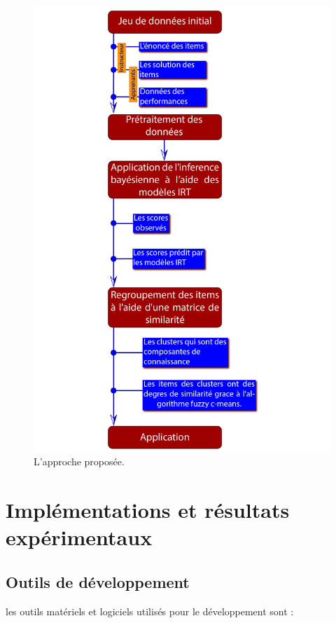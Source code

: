 \begin{figure}[H]
	\begin{center}
		\includegraphics[width=\textwidth]{images/chapitre7/approch.png}
	\end{center}
	\caption{L'approche proposée.}
	\label{approch}
\end{figure}

\section{Implémentations et résultats expérimentaux}

\subsection{Outils de développement}
les outils matériels et logiciels utilisés pour le développement sont :

